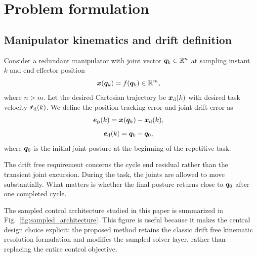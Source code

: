 \section{Problem formulation}

\subsection{Manipulator kinematics and drift definition}

Consider a redundant manipulator with joint vector $\bm{q}_k \in \mathbb{R}^n$ at sampling instant $k$ and end effector position
\begin{equation}
  \bm{x}(\bm{q}_k) = f(\bm{q}_k) \in \mathbb{R}^m,
\end{equation}
where $n > m$. Let the desired Cartesian trajectory be $\bm{x}_{\mathrm{d}}(k)$ with desired task velocity $\dot{\bm{r}}_{\mathrm{d}}(k)$. We define the position tracking error and joint drift error as
\begin{equation}
  \bm{e}_{\mathrm{p}}(k) = \bm{x}(\bm{q}_k) - \bm{x}_{\mathrm{d}}(k),
\end{equation}
\begin{equation}
  \bm{e}_{\mathrm{d}}(k) = \bm{q}_k - \bm{q}_0,
\end{equation}
where $\bm{q}_0$ is the initial joint posture at the beginning of the repetitive task.

The drift free requirement concerns the cycle end residual rather than the transient joint excursion. During the task, the joints are allowed to move substantially. What matters is whether the final posture returns close to $\bm{q}_0$ after one completed cycle.

The sampled control architecture studied in this paper is summarized in Fig.~\ref{fig:sampled_architecture}. This figure is useful because it makes the central design choice explicit: the proposed method retains the classic drift free kinematic resolution formulation and modifies the sampled solver layer, rather than replacing the entire control objective.

